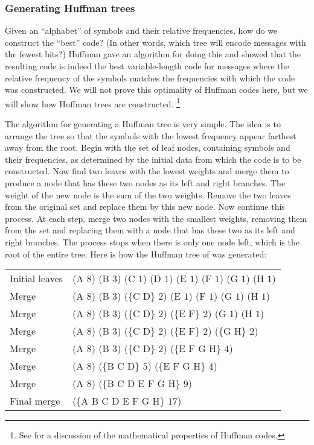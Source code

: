 \subsubsection*{Generating Huffman trees}

Given an “alphabet” of symbols and their relative frequencies, how do we construct the “best” code?
(In other words, which tree will encode messages with the fewest bits?)
Huffman gave an algorithm for doing this and showed that the resulting code is indeed the best variable-length code for messages where the relative frequency of the symbols matches the frequencies with which the code was constructed.
We will not prove this optimality of Huffman codes here, but we will show how Huffman trees are constructed.%
\footnote{
	See  for a discussion of the mathematical properties of Huffman codes.
}

The algorithm for generating a Huffman tree is very simple.
The idea is to arrange the tree so that the symbols with the lowest frequency appear farthest away from the root.
Begin with the set of leaf nodes, containing symbols and their frequencies, as determined by the initial data from which the code is to be constructed.
Now find two leaves with the lowest weights and merge them to produce a node that has these two nodes as its left and right branches.
The weight of the new node is the sum of the two weights.
Remove the two leaves from the original set and replace them by this new node.
Now continue this process.
At each step, merge two nodes with the smallest weights, removing them from the set and replacing them with a node that has these two as its left and right branches.
The process stops when there is only one node left, which is the root of the entire tree.
Here is how the Huffman tree of  was generated:
\begin{center}
	\begin{tabular}{ll}
		Initial leaves & (A \( 8 \)) (B \( 3 \)) (C \( 1 \)) (D \( 1 \)) (E \( 1 \)) (F \( 1 \)) (G \( 1 \)) (H \( 1 \))  \\
		Merge          & (A \( 8 \)) (B \( 3 \)) (\{C D\} \( 2 \)) (E \( 1 \)) (F \( 1 \)) (G \( 1 \)) (H \( 1 \))        \\
		Merge          & (A \( 8 \)) (B \( 3 \)) (\{C D\} \( 2 \)) (\{E F\} \( 2 \)) (G \( 1 \)) (H \( 1 \))              \\
		Merge          & (A \( 8 \)) (B \( 3 \)) (\{C D\} \( 2 \)) (\{E F\} \( 2 \)) (\{G H\} \( 2 \))                    \\
		Merge          & (A \( 8 \)) (B \( 3 \)) (\{C D\} \( 2 \)) (\{E F G H\} \( 4 \))                                  \\
		Merge          & (A \( 8 \)) (\{B C D\} \( 5 \)) (\{E F G H\} \( 4 \))                                            \\
		Merge          & (A \( 8 \)) (\{B C D E F G H\} \( 9 \))                                                          \\
		Final merge    & (\{A B C D E F G H\} \( 17 \))
	\end{tabular}
\end{center}


